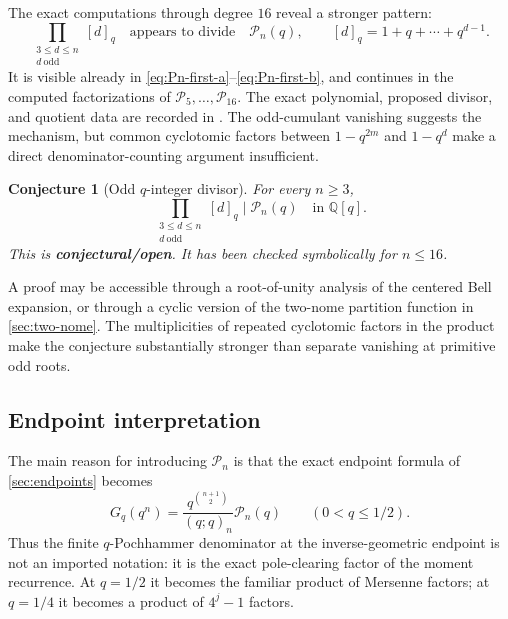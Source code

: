 \documentclass[11pt,oneside]{article}
\numberwithin{equation}{section}
\newtheorem{conjecture}[theorem]{Conjecture}
\theoremstyle{definition}
\theoremstyle{remark}
\newcommand{\Q}{\mathbb Q}
\newcommand{\openstatus}{\textcolor{deepred}{\textbf{conjectural/open}}}
\begin{document}
The exact computations through degree $16$ reveal a stronger pattern:
\begin{equation}
 \prod_{\substack{3\le d\le n\\d\ \mathrm{odd}}}[d]_q
 \quad\text{appears to divide}\quad \mathcal P_n(q),
 \qquad
 [d]_q=1+q+\cdots+q^{d-1}.
 \label{eq:Pn-divisibility-observed}
\end{equation}
It is visible already in \eqref{eq:Pn-first-a}--\eqref{eq:Pn-first-b}, and
continues in the computed factorizations of $\mathcal P_5,\ldots,\mathcal P_{16}$.
The exact polynomial, proposed divisor, and quotient data are recorded in
.
The odd-cumulant vanishing suggests the mechanism, but common cyclotomic
factors between $1-q^{2m}$ and $1-q^d$ make a direct denominator-counting
argument insufficient.

\begin{conjecture}[Odd $q$-integer divisor]
\label{conj:Pn-divisibility}
For every $n\ge3$,
\begin{equation}
 \boxed{
 \prod_{\substack{3\le d\le n\\d\ \mathrm{odd}}}[d]_q
 \mid \mathcal P_n(q)
 \quad\text{in }\Q[q].}
 \label{eq:Pn-divisibility}
\end{equation}
This is \openstatus.  It has been checked symbolically for $n\le16$.
\end{conjecture}

A proof may be accessible through a root-of-unity analysis of the centered
Bell expansion, or through a cyclic version of the two-nome partition function
in \cref{sec:two-nome}.  The multiplicities of repeated cyclotomic factors in
the product make the conjecture substantially stronger than separate
vanishing at primitive odd roots.

\subsection{Endpoint interpretation}

The main reason for introducing $\mathcal P_n$ is that the exact endpoint
formula of \cref{sec:endpoints} becomes
\begin{equation}
 \boxed{
 G_q(q^n)=\frac{q^{\binom{n+1}{2}}}{(q;q)_n}\mathcal P_n(q)
 \qquad(0<q\le1/2).}
 \label{eq:endpoint-Pn-preview}
\end{equation}
Thus the finite $q$-Pochhammer denominator at the inverse-geometric endpoint is
not an imported notation: it is the exact pole-clearing factor of the moment
recurrence.  At $q=1/2$ it becomes the familiar product of Mersenne factors;
at $q=1/4$ it becomes a product of $4^j-1$ factors.
\end{document}
